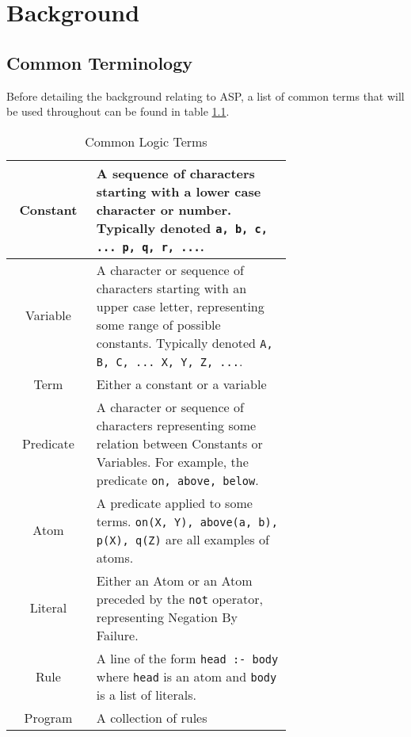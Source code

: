 \chapter{Background}

\section{Common Terminology}
Before detailing the background relating to ASP, a list of common terms that will be used throughout can be found in table \ref{table:4}.

\begin{table}[h!]
\centering
\makeatletter
\@fpsep\textheight
\makeatother
\begin{tabular}{| c | m{0.7\linewidth} |}
\hline
Constant & 
\mbox{}\newline
A sequence of characters starting with a lower case character or number. Typically denoted \lstinline!a, b, c, ... p, q, r, ...!. \newline
\\
\hline
Variable & 
\mbox{}\newline
A character or sequence of characters starting with an upper case letter, representing some range of possible constants. Typically denoted \lstinline!A, B, C, ... X, Y, Z, ...!.\newline
\\
\hline
Term &
\mbox{}\newline
Either a constant or a variable \newline
\\
\hline
Predicate &
\mbox{}\newline
A character or sequence of characters representing some relation between Constants or Variables. For example, the predicate \lstinline!on, above, below!. \newline
 \\
\hline
Atom &
\mbox{}\newline
A predicate applied to some terms. \lstinline!on(X, Y), above(a, b), p(X), q(Z)! are all examples of atoms.\newline
 \\
\hline
Literal & 
\mbox{}\newline
Either an Atom or an Atom preceded by the \lstinline!not! operator, representing Negation By Failure. \newline
\\
\hline
Rule & 
\mbox{}\newline
A line of the form \lstinline!head :- body! where \lstinline!head! is an atom and \lstinline!body! is a list of literals.
\newline
 \\
\hline
Program &
\mbox{}\newline
A collection of rules \newline
\\
\hline
\end{tabular}
\caption{Common Logic Terms}
\label{table:4}
\clearpage
\end{table}

